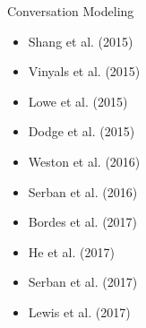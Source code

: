 \begin{frame}
\begin{columns}
\begin{column}{0.4\textwidth}
\begin{overlayarea}{\textwidth}{\textheight}
				\begin{block}{Conversation Modeling}
					\begin{itemize}
						\item Shang et al. (2015) \cite{DBLP:conf/acl/ShangLL15}
						\item Vinyals et al. (2015) \cite{DBLP:journals/corr/VinyalsL15}
						\item Lowe et al. (2015) \cite{DBLP:conf/sigdial/LowePSP15}
						\item Dodge et al. (2015) \cite{DBLP:journals/corr/DodgeGZBCMSW15}
						\item Weston et al. (2016) \cite{DBLP:journals/corr/WestonBCM15}
						\item Serban et al. (2016) \cite{DBLP:journals/corr/SerbanSLCPCB16}
						\item Bordes et al. (2017) \cite{DBLP:journals/corr/BordesW16}
						\item He et al. (2017)
						\item Serban et al. (2017) \cite{DBLP:journals/corr/abs-1709-02349}
						\item Lewis et al. (2017)
					\end{itemize}
				\end{block}
			\end{overlayarea}
		\end{column}

	\end{columns}
\end{frame}

